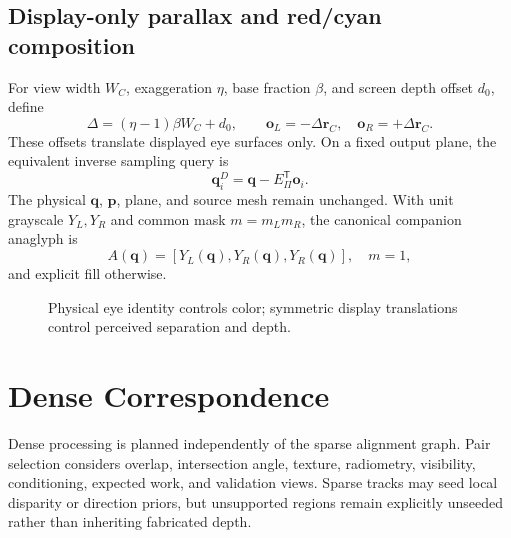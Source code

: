 \documentclass[journal]{IEEEtran}
\newcommand{\T}{^{\mathsf T}}
\begin{document}
\subsection{Display-only parallax and red/cyan composition}

For view width $W_C$, exaggeration $\eta$, base fraction $\beta$, and screen
depth offset $d_0$, define
\begin{equation}
\Delta=(\eta-1)\beta W_C+d_0,\qquad
\bm o_L=-\Delta\bm r_C,\quad \bm o_R=+\Delta\bm r_C.
\label{eq:parallax}
\end{equation}
These offsets translate displayed eye surfaces only. On a fixed output plane,
the equivalent inverse sampling query is
\begin{equation}
\bm q_i^D=\bm q-E_\Pi\T\bm o_i.
\label{eq:displayquery}
\end{equation}
The physical $\bm q$, $\bm p$, plane, and source mesh remain unchanged. With
unit grayscale $Y_L,Y_R$ and common mask $m=m_Lm_R$, the canonical companion
anaglyph is
\begin{equation}
A(\bm q)=\left[Y_L(\bm q),Y_R(\bm q),Y_R(\bm q)\right],\quad m=1,
\label{eq:anaglyph}
\end{equation}
and explicit fill otherwise.

\begin{figure}[t]
\centering
{}
\caption{Physical eye identity controls color; symmetric display translations
control perceived separation and depth.}
\label{fig:stereo}
\end{figure}

\section{Dense Correspondence}

Dense processing is planned independently of the sparse alignment graph. Pair
selection considers overlap, intersection angle, texture, radiometry,
visibility, conditioning, expected work, and validation views. Sparse tracks
may seed local disparity or direction priors, but unsupported regions remain
explicitly unseeded rather than inheriting fabricated depth.
\end{document}
